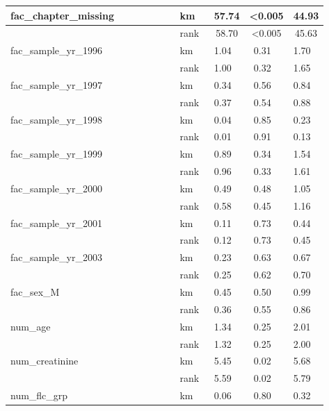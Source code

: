 \begin{table}[H]
\begin{tabular}{|l|l|c|c|c|}
 fac\_chapter\_missing            & km   & 57.74 & <0.005 & 44.93 \\ \hline
                                    & rank & 58.70 & <0.005 & 45.63 \\ \hline
 fac\_sample\_yr\_1996            & km   & 1.04  & 0.31   & 1.70  \\ \hline
                                    & rank & 1.00  & 0.32   & 1.65  \\ \hline
 fac\_sample\_yr\_1997            & km   & 0.34  & 0.56   & 0.84  \\ \hline
                                    & rank & 0.37  & 0.54   & 0.88  \\ \hline
 fac\_sample\_yr\_1998            & km   & 0.04  & 0.85   & 0.23  \\ \hline
                                    & rank & 0.01  & 0.91   & 0.13  \\ \hline
 fac\_sample\_yr\_1999            & km   & 0.89  & 0.34   & 1.54  \\ \hline
                                    & rank & 0.96  & 0.33   & 1.61  \\ \hline
 fac\_sample\_yr\_2000            & km   & 0.49  & 0.48   & 1.05  \\ \hline
                                    & rank & 0.58  & 0.45   & 1.16  \\ \hline
 fac\_sample\_yr\_2001            & km   & 0.11  & 0.73   & 0.44  \\ \hline
                                    & rank & 0.12  & 0.73   & 0.45  \\ \hline
 fac\_sample\_yr\_2003            & km   & 0.23  & 0.63   & 0.67  \\ \hline
                                    & rank & 0.25  & 0.62   & 0.70  \\ \hline
 fac\_sex\_M                      & km   & 0.45  & 0.50   & 0.99  \\ \hline
                                    & rank & 0.36  & 0.55   & 0.86  \\ \hline
 num\_age                         & km   & 1.34  & 0.25   & 2.01  \\ \hline
                                    & rank & 1.32  & 0.25   & 2.00  \\ \hline
 num\_creatinine                  & km   & 5.45  & 0.02   & 5.68  \\ \hline
                                    & rank & 5.59  & 0.02   & 5.79  \\ \hline
 num\_flc\_grp                    & km   & 0.06  & 0.80   & 0.32  \\ \hline

\end{tabular}
\end{table}
